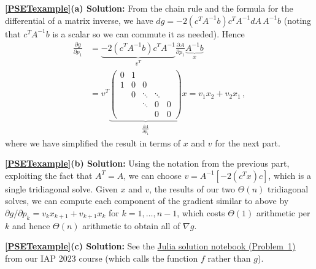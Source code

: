 \textbf{\cref{PSETexample}(a) Solution:} From the chain rule and the formula for the differential of a matrix inverse, we have $dg = -2(c^T A^{-1} b) c^T A^{-1} dA\,A^{-1} b$ (noting that $c^T A^{-1} b$ is a scalar so we can commute it as needed).  Hence
\begin{align*}
\frac{\partial g}{\partial p_1} &= \underbrace{-2(c^T A^{-1} b) c^T A^{-1}}_{v^T} \frac{\partial A}{\partial p_1} \underbrace{A^{-1} b}_x \\
&=  v^T \underbrace{\left(\begin{array}{ccccc}
0 & 1\\
1 & 0 & 0\\
 & 0 & \ddots & \ddots\\
 &  & \ddots & 0 & 0\\
 &  &  & 0 & 0
\end{array}\right)}_{\frac{\partial A}{\partial p_1}} x = \boxed{v_1 x_2 + v_2 x_1} \, ,
\end{align*}
where we have simplified the result in terms of $x$ and $v$ for the next part.

\textbf{\cref{PSETexample}(b) Solution:} Using the notation from the previous part, exploiting the fact that $A^T = A$, we can choose $\boxed{v = A^{-1} [-2(c^T x) c]}$, which is a single tridiagonal solve.  Given $x$ and $v$, the results of our two $\Theta(n)$ tridiagonal solves, we can compute each component of the gradient similar to above by $\boxed{\partial g/\partial p_k = v_k x_{k+1} + v_{k+1} x_k}$ for $k=1,\ldots,n-1$, which costs $\Theta(1)$ arithmetic per $k$ and hence $\Theta(n)$ arithmetic to obtain all of $\nabla g$.

\textbf{\cref{PSETexample}(c) Solution:} See the \href{https://nbviewer.org/github/mitmath/matrixcalc/blob/iap2023/psets/pset2sol.ipynb}{Julia solution notebook (Problem~1)} from our IAP 2023 course (which calls the function $f$ rather than $g$).